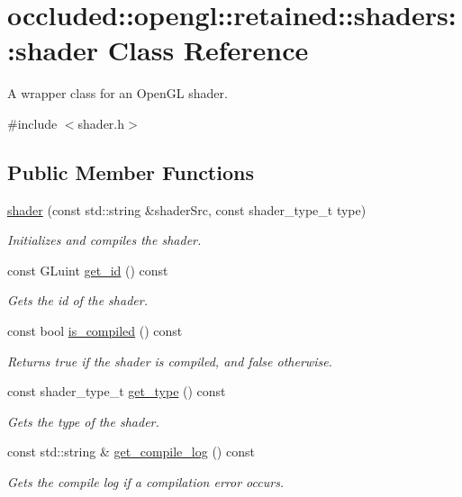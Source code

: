 \hypertarget{classoccluded_1_1opengl_1_1retained_1_1shaders_1_1shader}{\section{occluded\+:\+:opengl\+:\+:retained\+:\+:shaders\+:\+:shader Class Reference}
\label{classoccluded_1_1opengl_1_1retained_1_1shaders_1_1shader}
}


A wrapper class for an Open\+G\+L shader.  




{\ttfamily \#include $<$shader.\+h$>$}

\subsection*{Public Member Functions}
\begin{DoxyCompactItemize}
\item 
\hyperlink{classoccluded_1_1opengl_1_1retained_1_1shaders_1_1shader_ac40b834734bf03a1c060f771b1741823}{shader} (const std\+::string \&shader\+Src, const shader\+\_\+type\+\_\+t type)
\begin{DoxyCompactList}\small\item\em Initializes and compiles the shader. \end{DoxyCompactList}\item 
const G\+Luint \hyperlink{classoccluded_1_1opengl_1_1retained_1_1shaders_1_1shader_a1694ca35f6ad85cf95a3f6b3c7b783e3}{get\+\_\+id} () const 
\begin{DoxyCompactList}\small\item\em Gets the id of the shader. \end{DoxyCompactList}\item 
const bool \hyperlink{classoccluded_1_1opengl_1_1retained_1_1shaders_1_1shader_af1fe3fdd511da901ffa7665dad8a1d12}{is\+\_\+compiled} () const 
\begin{DoxyCompactList}\small\item\em Returns true if the shader is compiled, and false otherwise. \end{DoxyCompactList}\item 
const shader\+\_\+type\+\_\+t \hyperlink{classoccluded_1_1opengl_1_1retained_1_1shaders_1_1shader_af9befeaa32ea72f80d1c3825f4cd2f48}{get\+\_\+type} () const 
\begin{DoxyCompactList}\small\item\em Gets the type of the shader. \end{DoxyCompactList}\item 
const std\+::string \& \hyperlink{classoccluded_1_1opengl_1_1retained_1_1shaders_1_1shader_add6cda8459eb2a802e8eb22f70bbd1db}{get\+\_\+compile\+\_\+log} () const 
\begin{DoxyCompactList}\small\item\em Gets the compile log if a compilation error occurs. \end{DoxyCompactList}\end{DoxyCompactItemize}


